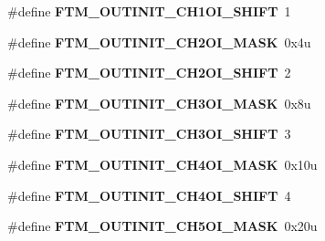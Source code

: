 \begin{DoxyCompactItemize}
\item 
\#define {\bfseries F\+T\+M\+\_\+\+O\+U\+T\+I\+N\+I\+T\+\_\+\+C\+H1\+O\+I\+\_\+\+S\+H\+I\+FT}~1\hypertarget{group__FTM__Register__Masks_ga419aab88bd101c374e1f1be56d122a35}{}\label{group__FTM__Register__Masks_ga419aab88bd101c374e1f1be56d122a35}

\item 
\#define {\bfseries F\+T\+M\+\_\+\+O\+U\+T\+I\+N\+I\+T\+\_\+\+C\+H2\+O\+I\+\_\+\+M\+A\+SK}~0x4u\hypertarget{group__FTM__Register__Masks_ga06ffa599245bdf8bb3c19f45a11f96f4}{}\label{group__FTM__Register__Masks_ga06ffa599245bdf8bb3c19f45a11f96f4}

\item 
\#define {\bfseries F\+T\+M\+\_\+\+O\+U\+T\+I\+N\+I\+T\+\_\+\+C\+H2\+O\+I\+\_\+\+S\+H\+I\+FT}~2\hypertarget{group__FTM__Register__Masks_ga25aa50131bfe6d3c09b6508e718bb638}{}\label{group__FTM__Register__Masks_ga25aa50131bfe6d3c09b6508e718bb638}

\item 
\#define {\bfseries F\+T\+M\+\_\+\+O\+U\+T\+I\+N\+I\+T\+\_\+\+C\+H3\+O\+I\+\_\+\+M\+A\+SK}~0x8u\hypertarget{group__FTM__Register__Masks_gaaa0b4f972bca3194e69fbe94021f3471}{}\label{group__FTM__Register__Masks_gaaa0b4f972bca3194e69fbe94021f3471}

\item 
\#define {\bfseries F\+T\+M\+\_\+\+O\+U\+T\+I\+N\+I\+T\+\_\+\+C\+H3\+O\+I\+\_\+\+S\+H\+I\+FT}~3\hypertarget{group__FTM__Register__Masks_ga083d497bae99715e175c5e73e27d3313}{}\label{group__FTM__Register__Masks_ga083d497bae99715e175c5e73e27d3313}

\item 
\#define {\bfseries F\+T\+M\+\_\+\+O\+U\+T\+I\+N\+I\+T\+\_\+\+C\+H4\+O\+I\+\_\+\+M\+A\+SK}~0x10u\hypertarget{group__FTM__Register__Masks_gab451c20f7002deae668749b6a886ca84}{}\label{group__FTM__Register__Masks_gab451c20f7002deae668749b6a886ca84}

\item 
\#define {\bfseries F\+T\+M\+\_\+\+O\+U\+T\+I\+N\+I\+T\+\_\+\+C\+H4\+O\+I\+\_\+\+S\+H\+I\+FT}~4\hypertarget{group__FTM__Register__Masks_gac61997ec656e9289b6b9b4a6df30b548}{}\label{group__FTM__Register__Masks_gac61997ec656e9289b6b9b4a6df30b548}

\item 
\#define {\bfseries F\+T\+M\+\_\+\+O\+U\+T\+I\+N\+I\+T\+\_\+\+C\+H5\+O\+I\+\_\+\+M\+A\+SK}~0x20u\hypertarget{group__FTM__Register__Masks_gaa0956e031b19115b7f91bf0138ef8dfe}{}\label{group__FTM__Register__Masks_gaa0956e031b19115b7f91bf0138ef8dfe}


\end{DoxyCompactItemize}
